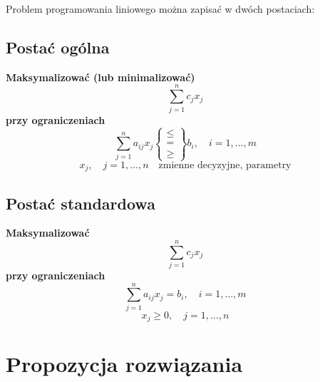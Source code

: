 Problem programowania liniowego można zapisać w dwóch postaciach:

\subsection{Postać ogólna}
    
    \noindent
    \textbf{Maksymalizować (lub minimalizować)}
    \[
    \sum_{j=1}^{n} c_j x_j
    \]
    \textbf{przy ograniczeniach}
    \[
    \sum_{j=1}^{n} a_{ij} x_j \left\{
    \begin{array}{l}
    \leq \\
    = \\
    \geq
    \end{array} \right\} b_i, \quad i = 1, \dots, m
    \]
    \[
    x_j, \quad j = 1, \dots, n \quad \text{zmienne decyzyjne, parametry}
    \]

\newpage

\subsection{Postać standardowa}

    \noindent
    \textbf{Maksymalizować}
    \[
    \sum_{j=1}^{n} c_j x_j \tag{9}
    \]
    \textbf{przy ograniczeniach}
    \[
    \sum_{j=1}^{n} a_{ij} x_j = b_i, \quad i = 1, \dots, m \tag{10}
    \]
    \[
    x_j \geq 0, \quad j = 1, \dots, n \tag{11}
    \]



\section{Propozycja rozwiązania}

